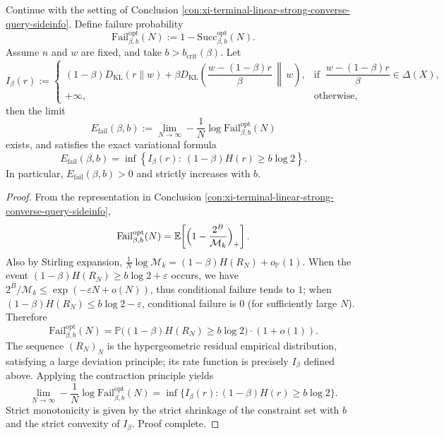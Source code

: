 \begin{conclusion}\label{con:xi-terminal-supercritical-failure-exponent-variational}
Continue with the setting of Conclusion \ref{con:xi-terminal-linear-strong-converse-query-sideinfo}.
Define failure probability
\[
\mathrm{Fail}^{\mathrm{opt}}_{\beta,b}(N):=1-\mathrm{Succ}^{\mathrm{opt}}_{\beta,b}(N).
\]
Assume \(n\) and \(w\) are fixed, and take \(b>b_{\mathrm{crit}}(\beta)\).
Let
\[
I_\beta(r):=
\begin{cases}
(1-\beta)D_{\mathrm{KL}}(r\|w)+\beta D_{\mathrm{KL}}\!\left(\dfrac{w-(1-\beta)r}{\beta}\,\middle\|\,w\right),
& \text{if }\ \dfrac{w-(1-\beta)r}{\beta}\in\Delta(X),\\[10pt]
+\infty, & \text{otherwise},
\end{cases}
\]
then the limit
\[
E_{\mathrm{fail}}(\beta,b)
:=
\lim_{N\to\infty}-\frac{1}{N}\log \mathrm{Fail}^{\mathrm{opt}}_{\beta,b}(N)
\]
exists, and satisfies the exact variational formula
\[
\boxed{\;
E_{\mathrm{fail}}(\beta,b)
=
\inf\left\{I_\beta(r):\ (1-\beta)H(r)\ge b\log 2\right\}.\;}
\]
In particular, \(E_{\mathrm{fail}}(\beta,b)>0\) and strictly increases with \(b\).
\end{conclusion}
\begin{proof}[Proof]
From the representation in Conclusion \ref{con:xi-terminal-linear-strong-converse-query-sideinfo},
\[
\mathrm{Fail}^{\mathrm{opt}}_{\beta,b}(N)
=
\mathbb{E}\!\left[\Bigl(1-\frac{2^B}{\mathcal{M}_k}\Bigr)_+\right].
\]
Also by Stirling expansion,
\(
\frac{1}{N}\log\mathcal{M}_k=(1-\beta)H(R_N)+o_{\mathbb{P}}(1)
\).
When the event \((1-\beta)H(R_N)\ge b\log 2+\varepsilon\) occurs, we have
\(
2^B/\mathcal{M}_k\le \exp(-\varepsilon N+o(N))
\), thus conditional failure tends to \(1\);
when \((1-\beta)H(R_N)\le b\log 2-\varepsilon\), conditional failure is \(0\) (for sufficiently large \(N\)).
Therefore
\[
\mathrm{Fail}^{\mathrm{opt}}_{\beta,b}(N)
=
\mathbb{P}\bigl((1-\beta)H(R_N)\ge b\log 2\bigr)\cdot(1+o(1)).
\]
The sequence \((R_N)_{N}\) is the hypergeometric residual empirical distribution, satisfying a large deviation principle; its rate function is precisely \(I_\beta\) defined above.
Applying the contraction principle yields
\[
\lim_{N\to\infty}-\frac{1}{N}\log \mathrm{Fail}^{\mathrm{opt}}_{\beta,b}(N)
=\inf\{I_\beta(r):(1-\beta)H(r)\ge b\log 2\}.
\]
Strict monotonicity is given by the strict shrinkage of the constraint set with \(b\) and the strict convexity of \(I_\beta\). Proof complete.
\end{proof}

